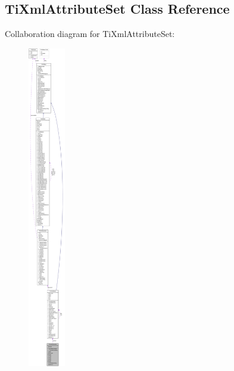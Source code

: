 \hypertarget{class_ti_xml_attribute_set}{
\subsection{TiXmlAttributeSet Class Reference}
\label{class_ti_xml_attribute_set}
}
Collaboration diagram for TiXmlAttributeSet:\nopagebreak
\begin{figure}[H]
\begin{center}
\leavevmode
\includegraphics[height=400pt]{class_ti_xml_attribute_set__coll__graph}
\end{center}
\end{figure}

